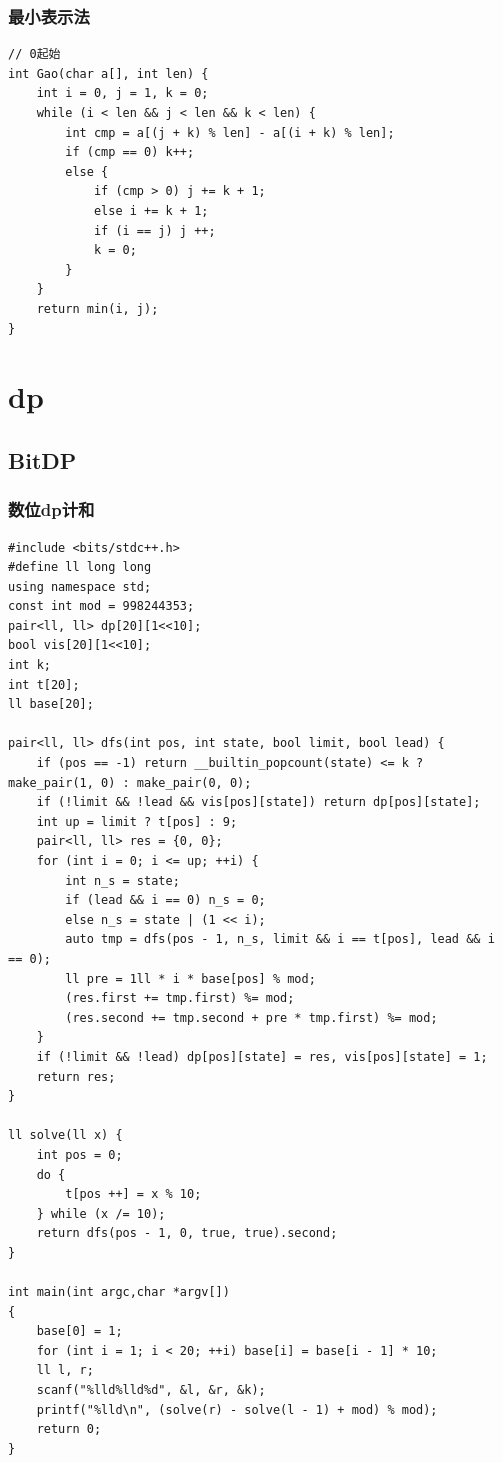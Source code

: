 \documentclass[twoside]{article}
\begin{document}
\subsubsection{最小表示法}
\begin{lstlisting}
// 0起始
int Gao(char a[], int len) {
    int i = 0, j = 1, k = 0;
    while (i < len && j < len && k < len) {
        int cmp = a[(j + k) % len] - a[(i + k) % len];
        if (cmp == 0) k++;
        else {
            if (cmp > 0) j += k + 1;
            else i += k + 1;
            if (i == j) j ++;
            k = 0;
        }
    }
    return min(i, j);
}\end{lstlisting}
\clearpage\section{dp}
\subsection{BitDP}
\subsubsection{数位dp计和}
\begin{lstlisting}
#include <bits/stdc++.h>
#define ll long long
using namespace std;
const int mod = 998244353;
pair<ll, ll> dp[20][1<<10];
bool vis[20][1<<10];
int k;
int t[20];
ll base[20];

pair<ll, ll> dfs(int pos, int state, bool limit, bool lead) {
    if (pos == -1) return __builtin_popcount(state) <= k ? make_pair(1, 0) : make_pair(0, 0);
    if (!limit && !lead && vis[pos][state]) return dp[pos][state];
    int up = limit ? t[pos] : 9;
    pair<ll, ll> res = {0, 0};
    for (int i = 0; i <= up; ++i) {
        int n_s = state;
        if (lead && i == 0) n_s = 0;
        else n_s = state | (1 << i);
        auto tmp = dfs(pos - 1, n_s, limit && i == t[pos], lead && i == 0);
        ll pre = 1ll * i * base[pos] % mod;
        (res.first += tmp.first) %= mod;
        (res.second += tmp.second + pre * tmp.first) %= mod;
    }
    if (!limit && !lead) dp[pos][state] = res, vis[pos][state] = 1;
    return res;
}

ll solve(ll x) {
    int pos = 0;
    do {
        t[pos ++] = x % 10;
    } while (x /= 10);
    return dfs(pos - 1, 0, true, true).second;
}

int main(int argc,char *argv[])
{
    base[0] = 1;
    for (int i = 1; i < 20; ++i) base[i] = base[i - 1] * 10;
    ll l, r;
    scanf("%lld%lld%d", &l, &r, &k);
    printf("%lld\n", (solve(r) - solve(l - 1) + mod) % mod);
    return 0;
}
\end{lstlisting}
\end{document}
